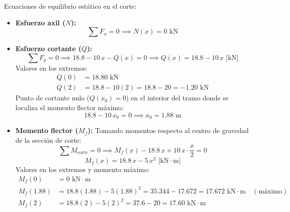 Ecuaciones de equilibrio estático en el corte:
\begin{itemize}
    \item \textbf{Esfuerzo axil ($N$):}
          \begin{equation}
              \sum F_x = 0 \implies \boxed{N(x) = 0\text{ kN}}
          \end{equation}

    \item \textbf{Esfuerzo cortante ($Q$):}
          \begin{equation}
              \sum F_y = 0 \implies 18.8 - 10\,x - Q(x) = 0 \implies \boxed{Q(x) = 18.8 - 10\,x\text{ [kN]}}
          \end{equation}
          Valores en los extremos:
          \begin{align*}
              Q(0) & = 18.80\text{ kN}                            \\
              Q(2) & = 18.8 - 10(2) = 18.8 - 20 = -1.20\text{ kN}
          \end{align*}
          Punto de cortante nulo ($Q(x_0) = 0$) en el interior del tramo donde se localiza el momento flector máximo:
          \begin{equation}
              18.8 - 10\,x_0 = 0 \implies \boxed{x_0 = 1.88\text{ m}}
          \end{equation}

    \item \textbf{Momento flector ($M_f$):}
          Tomando momentos respecto al centro de gravedad de la sección de corte:
          \begin{equation}
              \sum M_{\text{corte}} = 0 \implies M_f(x) - 18.8\,x + 10\,x \cdot \frac{x}{2} = 0
          \end{equation}
          \begin{equation}
              \boxed{M_f(x) = 18.8\,x - 5\,x^2\text{ [kN}\cdot\text{m]}}
          \end{equation}
          Valores en los extremos y momento máximo:
          \begin{align*}
              M_f(0)    & = 0\text{ kN}\cdot\text{m}                                                                               \\
              M_f(1.88) & = 18.8(1.88) - 5(1.88)^2 = 35.344 - 17.672 = \boxed{17.672\text{ kN}\cdot\text{m}} \quad (\text{máximo}) \\
              M_f(2)    & = 18.8(2) - 5(2)^2 = 37.6 - 20 = 17.60\text{ kN}\cdot\text{m}
          \end{align*}
\end{itemize}

